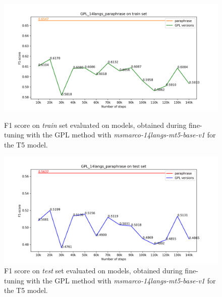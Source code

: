 \documentclass[fleqn,moreauthors,10pt]{ds_report}
\begin{document}
\begin{figure}[h]
    \centering
    \begin{minipage}{0.5\textwidth}
        \centering
        \includegraphics[width=\linewidth]{graphs/GPL_14langs_paraphrase_train.png}
        \caption{F1 score on \textit{train} set evaluated on models, obtained during fine-tuning with the GPL method with {\it msmarco-14langs-mt5-base-v1} \cite{msmarco14langs} for the T5 model.}
		\label{fig:gpl-versions-train}
    \end{minipage}\hfill
    \begin{minipage}{0.5\textwidth}
        \centering
        \includegraphics[width=\linewidth]{graphs/GPL_14langs_paraphrase_test.png}
        \caption{F1 score on \textit{test} set evaluated on models, obtained during fine-tuning with the GPL method with {\it msmarco-14langs-mt5-base-v1} \cite{msmarco14langs} for the T5 model.}
		\label{fig:gpl-versions}
    \end{minipage}
\end{figure}
\end{document}

